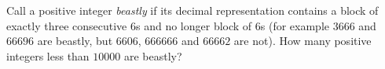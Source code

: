 Call a positive integer \emph{beastly} if its decimal representation contains a block of exactly three consecutive $6$s and no longer block of $6$s (for example $3666$ and $66696$ are beastly, but $6606$, $666666$ and $66662$ are not). How many positive integers less than $10000$ are beastly?
